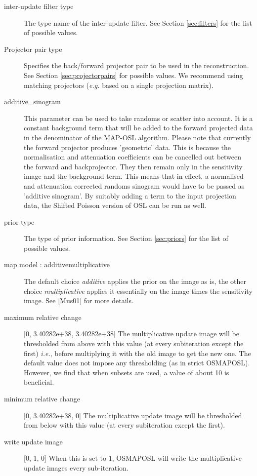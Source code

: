 \documentclass{article}
\begin{document}
\begin{description}
\item[inter-update filter type]
The type name of the inter-update filter. See Section \ref{sec:filters} for 
the list of possible values.



\item[Projector pair type]
Specifies the back/forward projector pair to be used in the reconstruction. 
See Section \ref{sec:projectorpairs} for possible values. We recommend using matching
projectors (\textit{e.g.} based on a single projection matrix).


\item[additive\_sinogram]
This parameter can be used to take randoms or scatter into account. 
It is a constant background term that will be added to the forward 
projected data in the denominator of the MAP-OSL algorithm. Please 
note that currently the forward projector produces 'geometric' 
data. This is because the normalisation and attenuation coefficients 
can be cancelled out between the forward and backprojector. They 
then remain only in the sensitivity image and the background 
term. This means that in effect, a normalised and attenuation 
corrected randoms sinogram would have to be passed as 'additive 
sinogram'. By suitably adding a term to the input projection 
data, the Shifted Poisson version of OSL can be run as well.

\item[prior type]
The type of prior information. See Section \ref{sec:priors} for the list 
of possible values.


\item[map model : additive{\textbar}multiplicative]
The default choice \textit{additive} applies the prior on the image 
as is, the other choice \textit{multiplicative} applies it essentially 
on the image times the sensitivity image. See [Mus01] for more 
details.


\item[maximum relative change] [0, 3.40282e+38, 3.40282e+38{]}
The multiplicative update image will be thresholded from above 
with this value (at every subiteration except the first) \textit{i.e.}, 
before multiplying it with the old image to get the new one. 
The default value does not impose any thresholding (as in strict 
OSMAPOSL). However, we find that when subsets are used, a value 
of about 10 is beneficial.


\item[minimum relative change] [0, 3.40282e+38, 0{]}
The multiplicative update image will be thresholded from below 
with this value (at every subiteration except the first).


\item[write update image] [0, 1, 0{]}
When this is set to 1, OSMAPOSL will write the multiplicative 
update images every sub-iteration.

\end{description}
\end{document}
